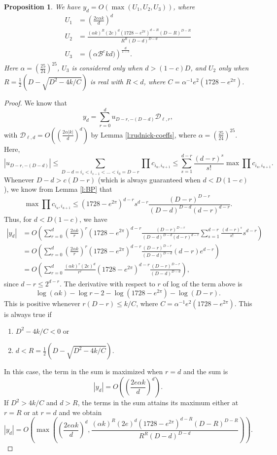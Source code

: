 \documentclass[12pt]{amsart}
\theoremstyle{plain} %
\newtheorem{proposition}[theorem]{Proposition}
\theoremstyle{definition}
\theoremstyle{remark}
\numberwithin{equation}{section}
\begin{document}
\begin{proposition}\label{p:faber-coefficients-general}
We have $\displaystyle y_d=O\left(\max(U_1,U_2,U_3)\right)$,
where 
\begin{align*}
  U_1&=\left(\frac{2e \alpha k}{d}\right)^d\\
  U_2&=\frac{(\alpha k)^R(2e)^d(1728-e^{2\pi})^{d-R}(D-R)^{D-R}}{R^R(D-d)^{D-d}}\\
  U_3&=\left(\alpha \mathcal{B}^ckd)\right)^{\frac{d}{1-c}}.
\end{align*}
Here $\alpha=\left(\frac{25}{24}\right)^{25}$, $U_3$ is considered only when $d>(1-c)D$, and $U_2$ only when $R=\frac{1}{2}(D-\sqrt{D^2-4k/C})$ is real with $R<d$, where $C=\alpha^{-1}e^2(1728-e^{2\pi})$.
\end{proposition}
\begin{proof}
We know that
\[y_d=\sum_{r=0}^{d} u_{D-r,-(D-d)} \mathcal{D}_{\ell,r},\]
with
$\mathcal{D}_{\ell,d}=O\left(\left(\frac{2 \alpha
  |k|}{d}\right)^d\right)$ by Lemma \ref{l:rudnick-coeffs},
where $\alpha=\left(\frac{25}{24}\right)^{25}$. Here,
\[|u_{D-r,-(D-d)}|\leq
\sum_{D-d=i_s<i_{s-1}<\ldots<i_0=D-r}\prod c_{i_u,i_{u+1}}\leq
\sum_{s=1}^{d-r}\frac{(d-r)^s}{s!}\max \prod c_{i_u,i_{u+1}}.\]
Whenever $D-d>c(D-r)$ (which is always guaranteed when $d<D(1-c)$), we know from Lemma \ref{l:BP} that
\[\max \prod c_{i_u,i_{u+1}}\leq
(1728-e^{2\pi})^{d-r}s^{d-r}\frac{(D-r)^{D-r}}{(D-d)^{D-d}(d-r)^{d-r}}.\]
Thus, for $d<D(1-c)$, we have
\begin{align*}
|y_d|&=O\left(\sum_{r=0}^{d}\left(\frac{2 \alpha k}{r}\right)^r(1728-e^{2\pi})^{d-r}\frac{(D-r)^{D-r}}{(D-d)^{D-d}(d-r)^{d-r}}\sum_{s=1}^{d-r}\frac{(d-r)^s}{s!}
                                              s^{d-r}\right)\\
  &=O\left(\sum_{r=0}^{d}\left(\frac{2 \alpha k}{r}\right)^r(1728-e^{2\pi})^{d-r}\frac{(D-r)^{D-r}}{(D-d)^{D-d}}(d-r)e^{d-r}\right)\\
  &=O\left(\sum_{r=0}^{d}\frac{(\alpha k)^{r}(2e)^d}{r^r}(1728-e^{2\pi})^{d-r}\frac{(D-r)^{D-r}}{(D-d)^{D-d}}\right),
\end{align*}
since $d-r\leq 2^{d-r}$.
The derivative with respect to $r$ of log of the term above is
\[\log (\alpha k) - \log r - 2 -\log(1728-e^{2\pi})-\log (D-r).\]
This is positive whenever $r(D-r)\leq k/C$, where
$C=\alpha^{-1}e^2(1728-e^{2\pi})$. This is always true if
\begin{enumerate}
\item $D^2-4k/C<0$ or
\item $d<R=\frac{1}{2}(D-\sqrt{D^2-4k/C})$.
\end{enumerate}
In this case, the term in the sum is maximized when $r=d$ and
the sum is
\[|y_d|=O\left(\left(\frac{2e \alpha k}{d}\right)^d\right).\]
If $D^2>4k/C$ and $d>R$, the terms in the sum attains its
maximum either at $r=R$ or at $r=d$
and we obtain
\[|y_d|=O\left(\max \left(\left(\frac{2e \alpha k}{d}\right)^d, \frac{(\alpha k)^R(2e)^d(1728-e^{2\pi})^{d-R}(D-R)^{D-R}}{R^R(D-d)^{D-d}}\right)\right).\]


\end{proof}
\end{document}
